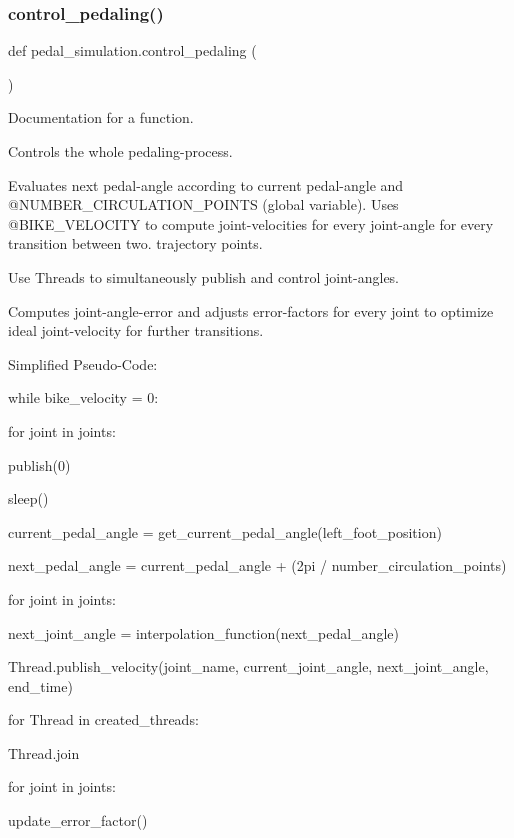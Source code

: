 \subsubsection{\texorpdfstring{control\_pedaling()}{control\_pedaling()}}
{\footnotesize\ttfamily def pedal\+\_\+simulation.\+control\+\_\+pedaling (\begin{DoxyParamCaption}{ }\end{DoxyParamCaption})}



Documentation for a function. 

Controls the whole pedaling-\/process.

Evaluates next pedal-\/angle according to current pedal-\/angle and @\+N\+U\+M\+B\+E\+R\+\_\+\+C\+I\+R\+C\+U\+L\+A\+T\+I\+O\+N\+\_\+\+P\+O\+I\+N\+TS (global variable). Uses @\+B\+I\+K\+E\+\_\+\+V\+E\+L\+O\+C\+I\+TY to compute joint-\/velocities for every joint-\/angle for every transition between two. trajectory points.

Use Threads to simultaneously publish and control joint-\/angles.

Computes joint-\/angle-\/error and adjusts error-\/factors for every joint to optimize ideal joint-\/velocity for further transitions.

Simplified Pseudo-\/\+Code\+:

while bike\+\_\+velocity = 0\+: \begin{DoxyVerb}for joint in joints:

    publish(0)

sleep()
\end{DoxyVerb}


current\+\_\+pedal\+\_\+angle = get\+\_\+current\+\_\+pedal\+\_\+angle(left\+\_\+foot\+\_\+position)

next\+\_\+pedal\+\_\+angle = current\+\_\+pedal\+\_\+angle + (2pi / number\+\_\+circulation\+\_\+points)

for joint in joints\+: \begin{DoxyVerb}next_joint_angle = interpolation_function(next_pedal_angle)

Thread.publish_velocity(joint_name, current_joint_angle, next_joint_angle, end_time)
\end{DoxyVerb}


for Thread in created\+\_\+threads\+: \begin{DoxyVerb}Thread.join
\end{DoxyVerb}


for joint in joints\+: \begin{DoxyVerb}update_error_factor()\end{DoxyVerb}
 

